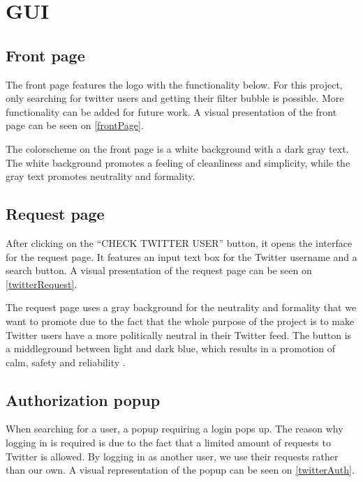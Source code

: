 \chapter{GUI} \label{GUI} 
\section{Front page}
The front page features the logo with the functionality below. For this
project, only searching for twitter users and getting their filter bubble is
possible. More functionality can be added for future work. A visual
presentation of the front page can be seen on \autoref{frontPage}.

{}

The colorscheme on the front page is a white background with a dark gray text.
The white background promotes a feeling of cleanliness and simplicity, while the
gray text promotes neutrality and formality\citep[p. 63 \& 64]{WebUI}. 

\section{Request page}
After clicking on the ``CHECK TWITTER USER'' button, it opens the interface for
the request page. It features an input text box for the Twitter username and a
search button. A visual presentation of the request page can be seen on \autoref{twitterRequest}.


The request page uses a gray background for the neutrality and formality that we
want to promote due to the fact that the whole purpose of the project is to
make Twitter users have a more politically neutral in their Twitter feed.
The button is a middleground between light and dark blue, which results in
a promotion of calm, safety and reliability \citep[p. 61 \& 64]{WebUI}.

\section{Authorization popup}

When searching for a user, a popup requiring a login pops up. The reason why
logging in is required is due to the fact that a limited amount of requests to
Twitter is allowed. By logging in as another user, we use their requests rather
than our own. A visual representation of the popup can be seen on
\autoref{twitterAuth}.

